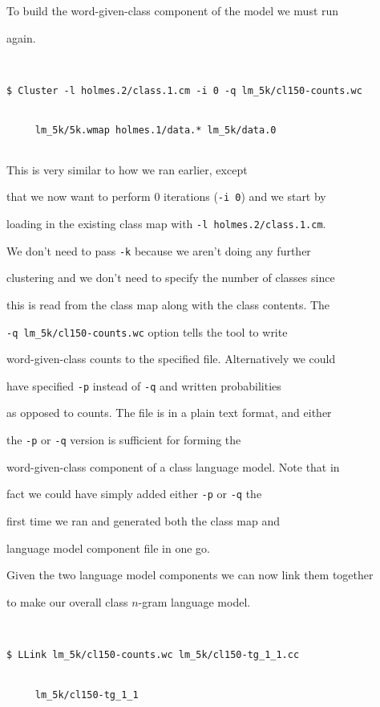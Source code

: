 To build the word-given-class component of the model we must run


 again.


\begin{verbatim}


$ Cluster -l holmes.2/class.1.cm -i 0 -q lm_5k/cl150-counts.wc


     lm_5k/5k.wmap holmes.1/data.* lm_5k/data.0


\end{verbatim} %





This is very similar to how we ran  earlier, except


that we now want to perform 0 iterations ({\tt -i 0}) and we start by


loading in the existing class map with {\tt -l holmes.2/class.1.cm}.


We don't need to pass {\tt -k} because we aren't doing any further


clustering and we don't need to specify the number of classes since


this is read from the class map along with the class contents.  The


{\tt -q lm\_5k/cl150-counts.wc} option tells the tool to write 


word-given-class counts to the specified file.  Alternatively we could


have specified {\tt -p} instead of {\tt -q} and written probabilities


as opposed to counts.  The file is in a plain text format, and either


the {\tt -p} or {\tt -q} version is sufficient for forming the


word-given-class component of a class language model.  Note that in


fact we could have simply added either {\tt -p} or {\tt -q} the


first time we ran  and generated both the class map and


language model component file in one go.





Given the two language model components we can now link them together


to make our overall class $n$-gram language model.


\begin{verbatim}


$ LLink lm_5k/cl150-counts.wc lm_5k/cl150-tg_1_1.cc


     lm_5k/cl150-tg_1_1


\end{verbatim} %





